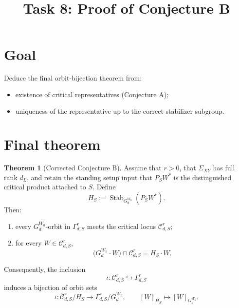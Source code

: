 \documentclass{article}
\title{Task 8: Proof of Conjecture B}
\date{}
\newcommand{\Stab}{\operatorname{Stab}}
\theoremstyle{definition}
\newtheorem{theorem}{Theorem}[section]
\begin{document}
\maketitle

\section{Goal}

Deduce the final orbit-bijection theorem from:

\begin{itemize}
\item existence of critical representatives (Conjecture A);
\item uniqueness of the representative up to the correct stabilizer subgroup.
\end{itemize}

\section{Final theorem}

\begin{theorem}[Corrected Conjecture B]\label{thm:conjecture-B}
Assume that $r>0$, that $\Sigma_{XY}$ has full rank $d_L$, and retain the
standing setup input that $P_SW^\ast$ is the distinguished critical product
attached to $S$. Define
\[
H_S:=\Stab_{G_d^{W_0}}(P_SW^\ast).
\]
Then:
\begin{enumerate}
\item every $G_d^{W_0}$-orbit in $\Gamma_{d,S}^r$ meets the critical locus
$\mathcal C_{d,S}^r$;
\item for every $W\in \mathcal C_{d,S}^r$,
\[
\bigl(G_d^{W_0}\cdot W\bigr)\cap \mathcal C_{d,S}^r
=
H_S\cdot W.
\]
\end{enumerate}
Consequently, the inclusion
\[
\iota:\mathcal C_{d,S}^r\hookrightarrow \Gamma_{d,S}^r
\]
induces a bijection of orbit sets
\[
\bar\iota:\mathcal C_{d,S}^r/H_S\to \Gamma_{d,S}^r/G_d^{W_0},
\qquad
[W]_{H_S}\mapsto [W]_{G_d^{W_0}}.
\]
\end{theorem}
\end{document}
